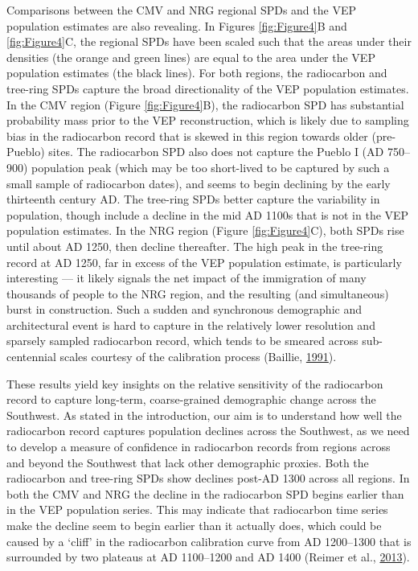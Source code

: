 \documentclass[
]{article}
\begin{document}
Comparisons between the CMV and NRG regional SPDs and the VEP population estimates are also revealing. In Figures \ref{fig:Figure4}B and \ref{fig:Figure4}C, the regional SPDs have been scaled such that the areas under their densities (the orange and green lines) are equal to the area under the VEP population estimates (the black lines). For both regions, the radiocarbon and tree-ring SPDs capture the broad directionality of the VEP population estimates. In the CMV region (Figure \ref{fig:Figure4}B), the radiocarbon SPD has substantial probability mass prior to the VEP reconstruction, which is likely due to sampling bias in the radiocarbon record that is skewed in this region towards older (pre-Pueblo) sites. The radiocarbon SPD also does not capture the Pueblo I (AD 750--900) population peak (which may be too short-lived to be captured by such a small sample of radiocarbon dates), and seems to begin declining by the early thirteenth century AD. The tree-ring SPDs better capture the variability in population, though include a decline in the mid AD 1100s that is not in the VEP population estimates. In the NRG region (Figure \ref{fig:Figure4}C), both SPDs rise until about AD 1250, then decline thereafter. The high peak in the tree-ring record at AD 1250, far in excess of the VEP population estimate, is particularly interesting --- it likely signals the net impact of the immigration of many thousands of people to the NRG region, and the resulting (and simultaneous) burst in construction. Such a sudden and synchronous demographic and architectural event is hard to capture in the relatively lower resolution and sparsely sampled radiocarbon record, which tends to be smeared across sub-centennial scales courtesy of the calibration process (Baillie, \protect\hyperlink{ref-Baillie1991}{1991}).

These results yield key insights on the relative sensitivity of the radiocarbon record to capture long-term, coarse-grained demographic change across the Southwest. As stated in the introduction, our aim is to understand how well the radiocarbon record captures population declines across the Southwest, as we need to develop a measure of confidence in radiocarbon records from regions across and beyond the Southwest that lack other demographic proxies. Both the radiocarbon and tree-ring SPDs show declines post-AD 1300 across all regions. In both the CMV and NRG the decline in the radiocarbon SPD begins earlier than in the VEP population series. This may indicate that radiocarbon time series make the decline seem to begin earlier than it actually does, which could be caused by a `cliff' in the radiocarbon calibration curve from AD 1200--1300 that is surrounded by two plateaus at AD 1100--1200 and AD 1400 (Reimer et al., \protect\hyperlink{ref-Reimer2013}{2013}).
\end{document}
